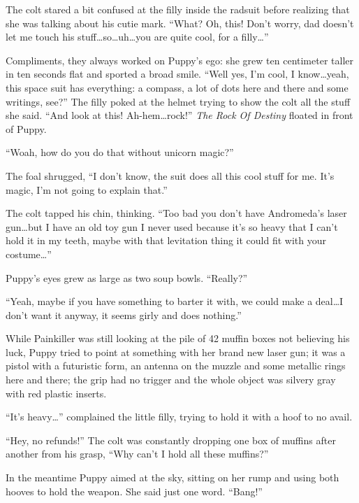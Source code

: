 The colt stared a bit confused at the filly inside the radsuit before realizing that she was talking about his cutie mark. ``What? Oh, this! Don't worry, dad doesn't let me touch his stuff\dots so\dots uh\dots you are quite cool, for a filly\dots''

Compliments, they always worked on Puppy's ego: she grew ten centimeter taller in ten seconds flat and sported a broad smile. ``Well yes, I'm cool, I know\dots yeah, this space suit has everything: a compass, a lot of dots here and there and some writings, see?'' The filly poked at the helmet trying to show the colt all the stuff she said. ``And look at this! Ah-hem\dots rock!'' \emph{The Rock Of Destiny} floated in front of Puppy.

``Woah, how do you do that without unicorn magic?''

The foal shrugged, ``I don't know, the suit does all this cool stuff for me. It's magic, I'm not going to explain that.''

The colt tapped his chin, thinking. ``Too bad you don't have Andromeda's laser gun\dots but I have an old toy gun I never used because it's so heavy that I can't hold it in my teeth, maybe with that levitation thing it could fit with your costume\dots''

Puppy's eyes grew as large as two soup bowls. ``Really?''

``Yeah, maybe if you have something to barter it with, we could make a deal\dots I don't want it anyway, it seems girly and does nothing.''

\horizonline


While Painkiller was still looking at the pile of 42 muffin boxes not believing his luck, Puppy tried to point at something with her brand new laser gun; it was a pistol with a futuristic form, an antenna on the muzzle and some metallic rings here and there; the grip had no trigger and the whole object was silvery gray with red plastic inserts.

``It's heavy\dots'' complained the little filly, trying to hold it with a hoof to no avail.

``Hey, no refunds!'' The colt was constantly dropping one box of muffins after another from his grasp, ``Why can't I hold all these muffins?''

In the meantime Puppy aimed at the sky, sitting on her rump and using both hooves to hold the weapon. She said just one word. ``Bang!''

